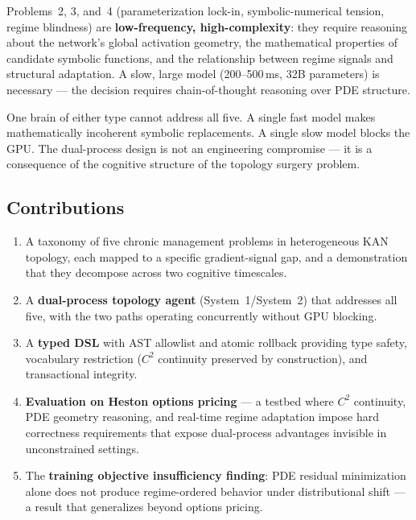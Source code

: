 \documentclass[11pt,a4paper]{article}
\begin{document}
Problems~2, 3, and~4 (parameterization lock-in, symbolic-numerical tension, regime
blindness) are \textbf{low-frequency, high-complexity}: they require reasoning about
the network's global activation geometry, the mathematical properties of candidate
symbolic functions, and the relationship between regime signals and structural
adaptation. A slow, large model (200--500\,ms, 32B parameters) is necessary --- the
decision requires chain-of-thought reasoning over PDE structure.

One brain of either type cannot address all five. A single fast model makes
mathematically incoherent symbolic replacements. A single slow model blocks the GPU.
The dual-process design is not an engineering compromise --- it is a consequence of
the cognitive structure of the topology surgery problem.

\subsection{Contributions}
\label{sec:intro:contributions}

\begin{enumerate}
  \item A taxonomy of five chronic management problems in heterogeneous KAN topology,
  each mapped to a specific gradient-signal gap, and a demonstration that they decompose
  across two cognitive timescales.

  \item A \textbf{dual-process topology agent} (System~1/System~2) that addresses all
  five, with the two paths operating concurrently without GPU blocking.

  \item A \textbf{typed DSL} with AST allowlist and atomic rollback providing type
  safety, vocabulary restriction ($C^2$ continuity preserved by construction), and
  transactional integrity.

  \item \textbf{Evaluation on Heston options pricing} --- a testbed where $C^2$
  continuity, PDE geometry reasoning, and real-time regime adaptation impose hard
  correctness requirements that expose dual-process advantages invisible in
  unconstrained settings.

  \item The \textbf{training objective insufficiency finding}: PDE residual
  minimization alone does not produce regime-ordered behavior under distributional
  shift --- a result that generalizes beyond options pricing.
\end{enumerate}
\end{document}
